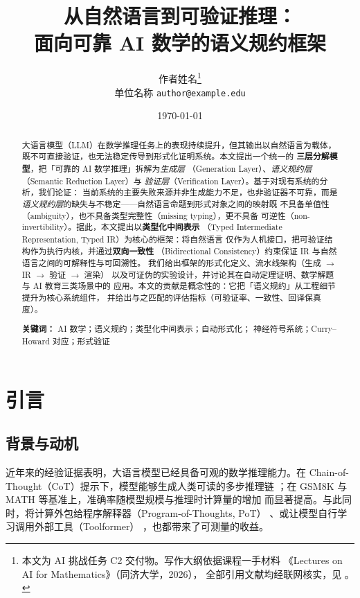 \documentclass[UTF8,a4paper,11pt]{ctexart}
\title{\bfseries 从自然语言到可验证推理：\\ 面向可靠 AI 数学的语义规约框架}
\author{%
  作者姓名\thanks{本文为 AI 挑战任务 C2 交付物。写作大纲依据课程一手材料
  《Lectures on AI for Mathematics》（同济大学，2026）\citep{chen2026lectures}，
  全部引用文献均经联网核实，见 \code{references.bib}。}%
  \\[2pt]
  \small 单位名称 \quad \texttt{author@example.edu}
}
\date{\today}
\begin{document}
\maketitle

\begin{abstract}
\noindent
大语言模型（LLM）在数学推理任务上的表现持续提升，但其输出以自然语言为载体，
既不可直接验证，也无法稳定传导到形式化证明系统。本文提出一个统一的
\textbf{三层分解模型}，把「可靠的 AI 数学推理」拆解为\emph{生成层}
（Generation Layer）、\emph{语义规约层}（Semantic Reduction Layer）与
\emph{验证层}（Verification Layer）。基于对现有系统的分析，我们论证：
当前系统的主要失败来源并非生成能力不足，也非验证器不可靠，而是
\emph{语义规约层}的缺失与不稳定——自然语言命题到形式对象之间的映射既
不具备单值性（ambiguity），也不具备类型完整性（missing typing），更不具备
可逆性（non-invertibility）。据此，本文提出以\textbf{类型化中间表示}
（Typed Intermediate Representation, Typed IR）为核心的框架：将自然语言
仅作为人机接口，把可验证结构作为执行内核，并通过\textbf{双向一致性}
（Bidirectional Consistency）约束保证 IR 与自然语言之间的可解释性与可回溯性。
我们给出框架的形式化定义、流水线架构（生成 $\to$ IR $\to$ 验证 $\to$ 渲染）
以及可证伪的实验设计，并讨论其在自动定理证明、数学解题与 AI 教育三类场景中的
应用。本文的贡献是概念性的：它把「语义规约」从工程细节提升为核心系统组件，
并给出与之匹配的评估指标（可验证率、一致性、回译保真度）。

\vspace{6pt}
\noindent\textbf{关键词：} AI 数学；语义规约；类型化中间表示；自动形式化；
神经符号系统；Curry--Howard 对应；形式验证
\end{abstract}

\section{引言}\label{sec:intro}

\subsection{背景与动机}

近年来的经验证据表明，大语言模型已经具备可观的数学推理能力。在
Chain-of-Thought（CoT）提示下，模型能够生成人类可读的多步推理链
\citep{wei2022cot}；在 GSM8K \citep{cobbe2021gsm8k} 与 MATH
\citep{hendrycks2021math} 等基准上，准确率随模型规模与推理时计算量的增加
而显著提高。与此同时，将计算外包给程序解释器（Program-of-Thoughts, PoT）
\citep{chen2023pot}、或让模型自行学习调用外部工具（Toolformer）
\citep{schick2023toolformer}，也都带来了可测量的收益。
\end{document}

